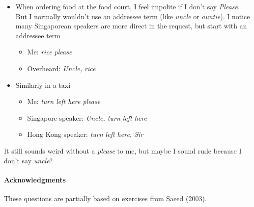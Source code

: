 \documentclass[a4paper]{article}
\newcommand{\eng}[1]{\textit{#1}}
\begin{document}
\begin{enumerate}
  \begin{itemize}
  \item When ordering food at the food court, I feel impolite if I
    don't say \textit{Please}.  But I normally wouldn't use an
    addressee term (like \textit{uncle} or \textit{auntie}).  I notice
    many Singaporean speakers are more direct in the request, but
    start with an addressee term
    \begin{itemize}
    \item Me: \eng{rice please}
    \item Overheard: \eng{Uncle, rice}
    \end{itemize}
     \item Similarly in a taxi
    \begin{itemize}
    \item Me: \eng{turn left here please}
    \item Singapore speaker: \eng{Uncle, turn left here}
    \item Hong Kong speaker: \eng{turn left here, Sir}
    \end{itemize}
  \end{itemize}
  It still sounds weird without a \eng{please} to me, but maybe I
  sound rude because I don't say \eng{uncle}?
\end{enumerate}
\vfill
\paragraph{Acknowledgments} These questions are partially
based on exercises from Saeed (2003).
\end{document}
